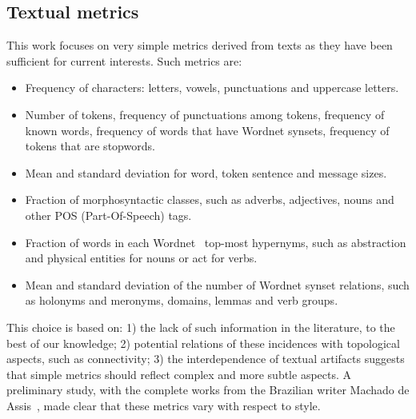 \subsection{Textual metrics}
This work focuses on very simple metrics derived from texts as they have been sufficient for current interests.
Such metrics are:
\begin{itemize}
\item Frequency of characters: letters, vowels, punctuations and uppercase letters.
\item Number of tokens, frequency of punctuations among tokens, frequency of known words, frequency of words that have Wordnet synsets, frequency of tokens that are stopwords.
\item Mean and standard deviation for word, token sentence and message sizes.
\item Fraction of morphosyntactic classes, such as adverbs, adjectives, nouns and other POS (Part-Of-Speech) tags.
\item Fraction of words in each Wordnet~\cite{wordnet} top-most hypernyms,
such as abstraction and physical entities for nouns or act for verbs.
\item Mean and standard deviation of the number of Wordnet synset relations, such as holonyms and meronyms, domains, lemmas and verb groups.
\end{itemize}

This choice is based on: 1) the lack of such information in the literature, to the best of our knowledge; 
2) potential relations of these incidences with topological aspects, such as connectivity;
3) the interdependence of textual artifacts suggests that simple metrics should reflect complex and more subtle aspects.
A preliminary study, with the complete works from the Brazilian writer Machado de Assis~\cite{machado},
made clear that these metrics vary with respect to style.

